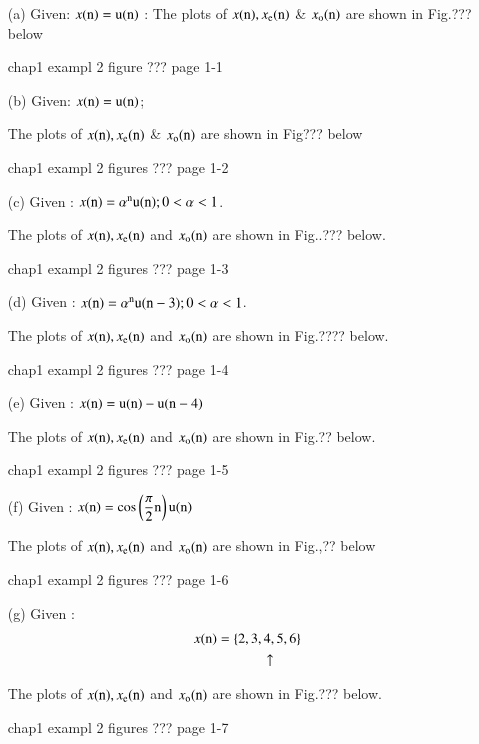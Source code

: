 \begin{solution}
\begin{itemize}
\item[{\rm (a)}] Given: $x(\textrm{n})=\textrm{u}(\textrm{n})$  : The plots of $x(\textrm{n}), x_{\textrm{e}}(\textrm{n})$ \& $x_{\textrm{o}}(\textrm{n})$ are shown in Fig.??? below
\begin{center}
chap1 exampl 2 figure ??? page 1-1 
\end{center}

\item[{\rm (b)}] Given: $x(\textrm{n})= \textrm{u}(\textrm{n})$;

The plots of $x(\textrm{n}), x_{\textrm{e}}(\textrm{n})$ \& $x_{\textrm{o}}(\textrm{n})$ are shown in Fig??? below
 \begin{center}
chap1 exampl 2 figures ??? page 1-2 
\end{center}

\item[{\rm (c)}] Given : $x(\textrm{n})= \alpha^{\textrm{n}}\textrm{u}(\textrm{n}) ; 0 < \alpha < 1$.

The plots of $x(\textrm{n}), x_{\textrm{e}}(\textrm{n})$ and $x_{\textrm{o}}(\textrm{n})$ are shown in Fig..??? below.
\begin{center}
chap1 exampl 2 figures ??? page 1-3 
\end{center}

\item[{\rm (d)}] Given : $x(\textrm{n}) = \alpha^{\textrm{n}} \textrm{u}(\textrm{n}-3) ; 0 < \alpha < 1$.

The plots of $x(\textrm{n}), x_{\textrm{e}}(\textrm{n})$ and $x_{\textrm{o}}(\textrm{n})$ are shown in Fig.???? below.
\begin{center}
chap1 exampl 2 figures ??? page 1-4 
\end{center}

\item[{\rm (e)}] Given : $x(\textrm{n}) =\textrm{u}(\textrm{n})-\textrm{u}(\textrm{n}-4)$

The plots of $x(\textrm{n}), x_{\textrm{e}}(\textrm{n})$ and $x_{\textrm{o}}(\textrm{n})$ are shown in Fig.?? below.
\begin{center}
chap1 exampl 2 figures ??? page 1-5 
\end{center}

\item[{\rm (f)}] Given : $x(\textrm{n}) = \cos\left(\dfrac{\pi}{2} \textrm{n} \right)\textrm{u}(\textrm{n})$

The plots of $x(\textrm{n}), x_{\textrm{e}}(\textrm{n})$ and $x_{\textrm{o}}(\textrm{n})$ are shown in Fig.,?? below
\begin{center}
chap1 exampl 2 figures ??? page 1-6 
\end{center}

\item[{\rm (g)}]Given :
\begin{align*}
x(\textrm{n}) &= \{2,3,4,5,6\}\\
        & \qquad \quad \;\uparrow
\end{align*}

The plots of $x(\textrm{n}), x_{\textrm{e}}(\textrm{n})$ and $x_{\textrm{o}}(\textrm{n})$ are shown in Fig.??? below.
\begin{center}
chap1 exampl 2 figures ??? page 1-7 
\end{center}
\end{itemize}
\end{solution}
\label{1end}
